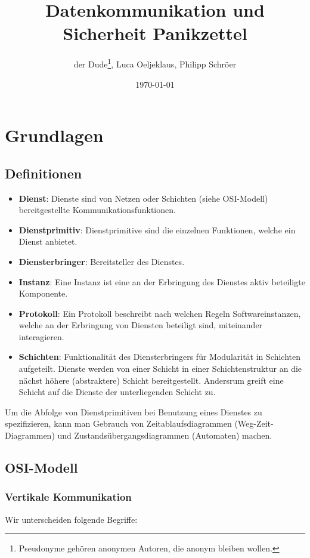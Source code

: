 \documentclass[a4paper,parskip=half*,DIV=15,fontsize=11pt]{scrartcl}
\title{Datenkommunikation und Sicherheit Panikzettel}
\author{der Dude\footnote{Pseudonyme gehören anonymen Autoren, die anonym bleiben wollen.}, Luca Oeljeklaus, Philipp Schröer}
\date{\today}
\begin{document}
\maketitle

\tableofcontents

\section{Grundlagen}
\subsection{Definitionen}
\begin{itemize}
    \item \textbf{Dienst}: Dienste sind von Netzen oder Schichten (siehe OSI-Modell) bereitgestellte Kommunikationsfunktionen.
    \item \textbf{Dienstprimitiv}: Dienstprimitive sind die einzelnen Funktionen, welche ein Dienst anbietet.
    \item \textbf{Diensterbringer}: Bereitsteller des Dienstes.
    \item \textbf{Instanz}: Eine Instanz ist eine an der Erbringung des Dienstes aktiv beteiligte Komponente.
    \item \textbf{Protokoll}: Ein Protokoll beschreibt nach welchen Regeln Softwareinstanzen, welche an der Erbringung von Diensten beteiligt sind, miteinander interagieren.
    \item \textbf{Schichten}: Funktionalität des Diensterbringers für Modularität in Schichten aufgeteilt. Dienste werden von einer Schicht in einer Schichtenstruktur an die nächst höhere (abstraktere) Schicht bereitgestellt. Andersrum greift eine Schicht auf die Dienste der unterliegenden Schicht zu.
\end{itemize}

Um die Abfolge von Dienstprimitiven bei Benutzung eines Dienstes zu spezifizieren, kann man Gebrauch von Zeitablaufsdiagrammen (Weg-Zeit-Diagrammen) und Zustandsübergangsdiagrammen (Automaten) machen.

\subsection{OSI-Modell}
\subsubsection{Vertikale Kommunikation}
Wir unterscheiden folgende Begriffe:
\end{document}
